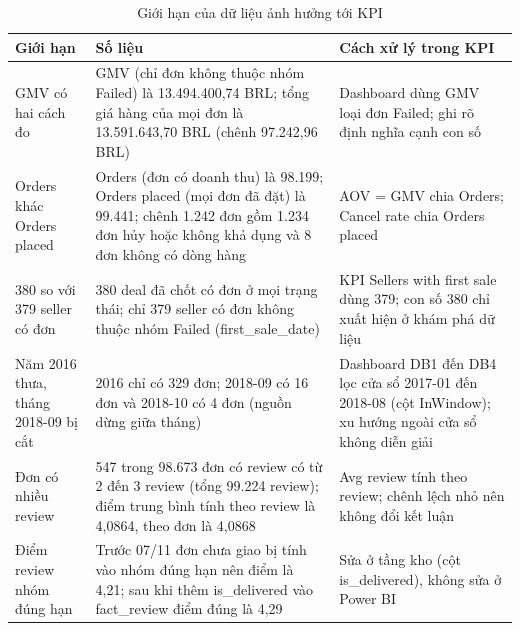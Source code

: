 \begin{table}[htbp]\centering\scriptsize\caption{Giới hạn của dữ liệu ảnh hưởng tới KPI}\label{tab:gioi-han}
\begin{tabular}{p{2.85cm}p{7.03cm}p{4.56cm}}\toprule
\textbf{Giới hạn} & \textbf{Số liệu} & \textbf{Cách xử lý trong KPI}\\\midrule
GMV có hai cách đo & GMV (chỉ đơn không thuộc nhóm Failed) là 13.494.400,74 BRL; tổng giá hàng của mọi đơn là 13.591.643,70 BRL (chênh 97.242,96 BRL) & Dashboard dùng GMV loại đơn Failed; ghi rõ định nghĩa cạnh con số\\
Orders khác Orders placed & Orders (đơn có doanh thu) là 98.199; Orders placed (mọi đơn đã đặt) là 99.441; chênh 1.242 đơn gồm 1.234 đơn hủy hoặc không khả dụng và 8 đơn không có dòng hàng & AOV = GMV chia Orders; Cancel rate chia Orders placed\\
380 so với 379 seller có đơn & 380 deal đã chốt có đơn ở mọi trạng thái; chỉ 379 seller có đơn không thuộc nhóm Failed (first\_sale\_date) & KPI Sellers with first sale dùng 379; con số 380 chỉ xuất hiện ở khám phá dữ liệu\\
Năm 2016 thưa, tháng 2018-09 bị cắt & 2016 chỉ có 329 đơn; 2018-09 có 16 đơn và 2018-10 có 4 đơn (nguồn dừng giữa tháng) & Dashboard DB1 đến DB4 lọc cửa sổ 2017-01 đến 2018-08 (cột InWindow); xu hướng ngoài cửa sổ không diễn giải\\
Đơn có nhiều review & 547 trong 98.673 đơn có review có từ 2 đến 3 review (tổng 99.224 review); điểm trung bình tính theo review là 4,0864, theo đơn là 4,0868 & Avg review tính theo review; chênh lệch nhỏ nên không đổi kết luận\\
Điểm review nhóm đúng hạn & Trước 07/11 đơn chưa giao bị tính vào nhóm đúng hạn nên điểm là 4,21; sau khi thêm is\_delivered vào fact\_review điểm đúng là 4,29 & Sửa ở tầng kho (cột is\_delivered), không sửa ở Power BI\\
\bottomrule\end{tabular}\end{table}
